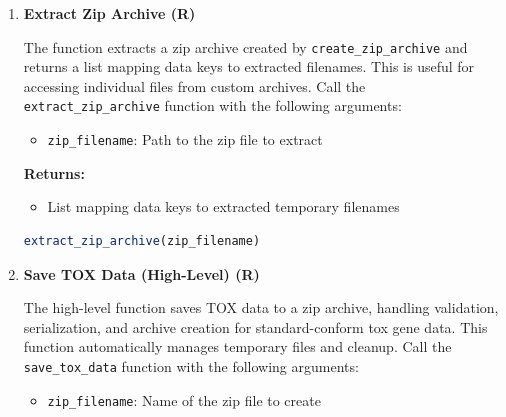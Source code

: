 \documentclass[11pt]{article}
\begin{document}
\begin{enumerate}
	\begin{itemize}
	\item \texttt{zip\_filename}: Name of the zip file to create
	      
	\item \texttt{keys}: Vector of keys for the manifest (identifiers for
	      each file)
	      
	\item \texttt{filenames}: Vector of filenames to include in archive
	\end{itemize}

\begin{lstlisting}[language=R, caption={R Create Zip Archive (Low-Level)}]
create_zip_archive(zip_filename, keys, filenames)
\end{lstlisting}

\item \textbf{Extract Zip Archive (R)}

The function extracts a zip archive created by \texttt{create\_zip\_archive}
and returns a list mapping data keys to extracted filenames. This is useful
for accessing individual files from custom archives. Call the \texttt{extract\_zip\_archive}
function with the following arguments:

\begin{itemize}
	\item \texttt{zip\_filename}: Path to the zip file to extract
\end{itemize}

\textbf{Returns:}
\begin{itemize}
	\item List mapping data keys to extracted temporary filenames
\end{itemize}

\begin{lstlisting}[language=R, caption={R Extract Zip Archive}]
extract_zip_archive(zip_filename)
\end{lstlisting}

\item \textbf{Save TOX Data (High-Level) (R)}

The high-level function saves TOX data to a zip archive, handling
validation, serialization, and archive creation for standard-conform tox
gene data. This function automatically manages temporary files and cleanup.
Call the \texttt{save\_tox\_data} function with the following arguments:

\begin{itemize}
	\item \texttt{zip\_filename}: Name of the zip file to create
	      

\end{itemize}
\end{enumerate}
\end{document}
